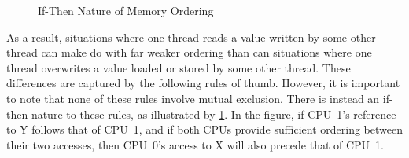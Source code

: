 \begin{figure}
\centering
{}
\caption{If-Then Nature of Memory Ordering}
\label{fig:memorder:If-Then Nature of Memory Ordering}
\end{figure}

As a result, situations where one thread reads a value written by some
other thread can make do with far weaker ordering than can situations
where one thread overwrites a value loaded or stored by some other thread.
These differences are captured by the following rules of thumb.
However, it is important to note that none of these rules involve
mutual exclusion.
There is instead an if-then nature to these rules, as illustrated by
\cref{fig:memorder:If-Then Nature of Memory Ordering}.
In the figure, if CPU~1's reference to Y follows that of CPU~1,
and if both CPUs provide sufficient ordering between their two
accesses, then CPU~0's access to X will also precede that of
CPU~1.

